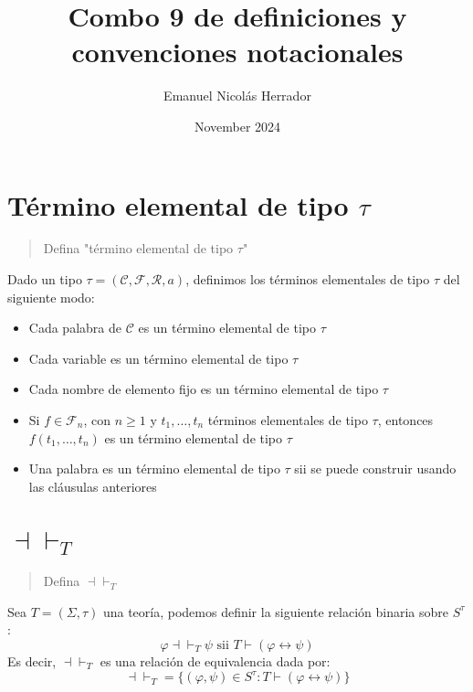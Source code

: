 \documentclass{article}
\title{Combo 9 de definiciones y convenciones notacionales}
\author{Emanuel Nicolás Herrador}
\date{November 2024}
\begin{document}
\maketitle

\section{Término elemental de tipo $\tau$}
\begin{quote}
  Defina "término elemental de tipo $\tau$"
\end{quote}
Dado un tipo $\tau=(\mathcal{C},\mathcal{F},\mathcal{R},a)$, definimos los términos elementales de tipo $\tau$ del siguiente modo:
\begin{itemize}
  \item Cada palabra de $\mathcal{C}$ es un término elemental de tipo $\tau$
  \item Cada variable es un término elemental de tipo $\tau$
  \item Cada nombre de elemento fijo es un término elemental de tipo $\tau$
  \item Si $f\in\mathcal{F}_n$, con $n\geq 1$ y $t_1,\dots,t_n$ términos elementales de tipo $\tau$, entonces $f(t_1,\dots,t_n)$ es un término elemental de tipo $\tau$
  \item Una palabra es un término elemental de tipo $\tau$ sii se puede construir usando las cláusulas anteriores
\end{itemize}

\section{$\dashv\vdash_T$}
\begin{quote}
  Defina $\dashv\vdash_T$
\end{quote}
Sea $T=(\Sigma,\tau)$ una teoría, podemos definir la siguiente relación binaria sobre $S^\tau$:
\begin{equation*}
  \varphi\dashv\vdash_T\psi\text{ sii }T\vdash(\varphi\leftrightarrow\psi)
\end{equation*}
Es decir, $\dashv\vdash_T$ es una relación de equivalencia dada por:
\begin{equation*}
  \dashv\vdash_T=\{(\varphi,\psi)\in S^\tau:T\vdash(\varphi\leftrightarrow\psi)\}
\end{equation*}
\end{document}
